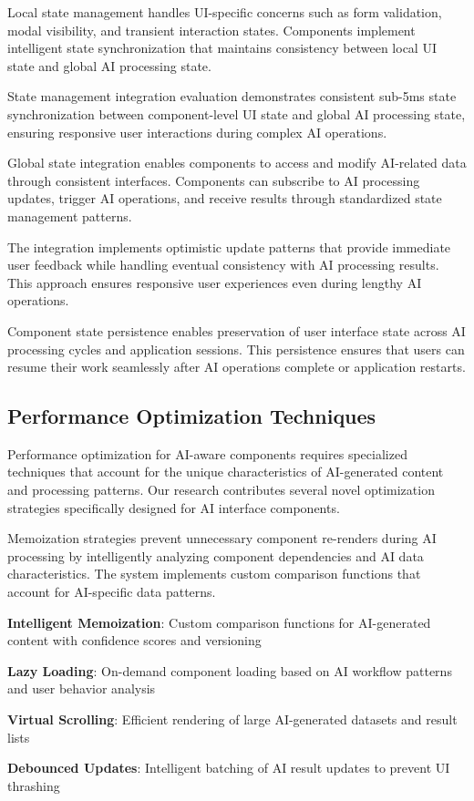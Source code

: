 Local state management handles UI-specific concerns such as form validation, modal visibility, and transient interaction states. Components implement intelligent state synchronization that maintains consistency between local UI state and global AI processing state.

\begin{successbox}
State management integration evaluation demonstrates consistent sub-5ms state synchronization between component-level UI state and global AI processing state, ensuring responsive user interactions during complex AI operations.
\end{successbox}

Global state integration enables components to access and modify AI-related data through consistent interfaces. Components can subscribe to AI processing updates, trigger AI operations, and receive results through standardized state management patterns.

The integration implements optimistic update patterns that provide immediate user feedback while handling eventual consistency with AI processing results. This approach ensures responsive user experiences even during lengthy AI operations.

Component state persistence enables preservation of user interface state across AI processing cycles and application sessions. This persistence ensures that users can resume their work seamlessly after AI operations complete or application restarts.

\subsection*{Performance Optimization Techniques}

Performance optimization for AI-aware components requires specialized techniques that account for the unique characteristics of AI-generated content and processing patterns. Our research contributes several novel optimization strategies specifically designed for AI interface components.

Memoization strategies prevent unnecessary component re-renders during AI processing by intelligently analyzing component dependencies and AI data characteristics. The system implements custom comparison functions that account for AI-specific data patterns.

\begin{expandedlist}
    \item \textbf{Intelligent Memoization}: Custom comparison functions for AI-generated content with confidence scores and versioning
    \item \textbf{Lazy Loading}: On-demand component loading based on AI workflow patterns and user behavior analysis
    \item \textbf{Virtual Scrolling}: Efficient rendering of large AI-generated datasets and result lists
    \item \textbf{Debounced Updates}: Intelligent batching of AI result updates to prevent UI thrashing
\end{expandedlist}

